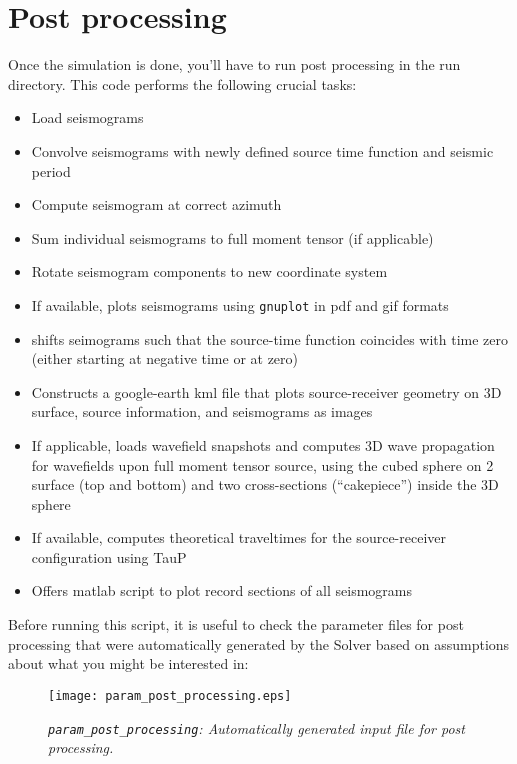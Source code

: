 \documentclass[11pt,letter,fleqn,english,notitlepage]{article}
\begin{document}
\section{Post processing}
Once the simulation is done, you'll have to run post processing in the
run directory. This code performs the following 
crucial tasks:
\begin{itemize}
\item Load seismograms
\item Convolve seismograms with newly defined source time function and seismic period
\item Compute seismogram at correct azimuth
\item Sum individual seismograms to full moment tensor (if applicable)
\item Rotate seismogram components to new coordinate system
\item If available, plots seismograms using {\tt gnuplot} in pdf and
  gif formats
\item shifts seimograms such that the source-time function coincides
  with time zero (either starting at negative time or at zero)
\item Constructs a google-earth kml file that plots source-receiver geometry on 3D surface, source information, 
and seismograms as images
\item If applicable, loads wavefield snapshots and computes 3D wave propagation for wavefields upon full
moment tensor source, using the cubed sphere on 2 surface (top and bottom) and two cross-sections (``cakepiece'') 
inside the 3D sphere
\item If available, computes theoretical traveltimes for the source-receiver configuration using TauP
\item Offers matlab script to plot record sections of all seismograms
\end{itemize}

\noindent Before running this script, it is useful to check the parameter files for post processing that were automatically 
generated by the Solver based on assumptions about what you might be interested in:\\

\begin{figure*}[htb]
\begin{center}
\texttt{[image: param\_post\_processing.eps]}
\caption{\textit{{\tt param\_post\_processing}: Automatically generated input file for post processing.}}
\end{center}
\end{figure*}
\end{document}
